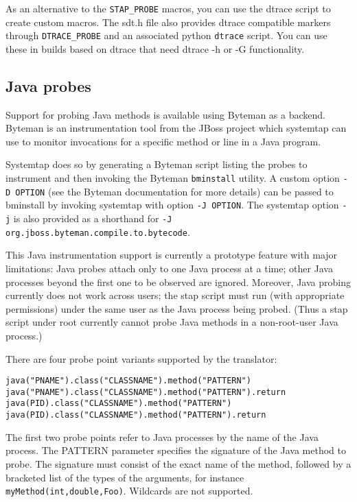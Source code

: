 \documentclass[twoside,english]{article}
\newenvironment{vindent}
{\begin{list}{}{\setlength{\listparindent}{6pt}}
\item[]}
{\end{list}}
\begin{document}
As an alternative to the \texttt{STAP\_PROBE} macros, you can use the
dtrace script to create custom macros. The sdt.h file also provides
dtrace compatible markers through \texttt{DTRACE\_PROBE} and an
associated python \texttt{dtrace} script.  You can use these in builds
based on dtrace that need dtrace -h or -G functionality.

\subsection{Java probes}
Support for probing Java methods is available using Byteman as a
backend. Byteman is an instrumentation tool from the JBoss project
which systemtap can use to monitor invocations for a specific method
or line in a Java program.

Systemtap does so by generating a Byteman script listing the probes to
instrument and then invoking the Byteman \texttt{bminstall} utility. A
custom option \texttt{-D OPTION} (see the Byteman documentation for
more details) can be passed to bminstall by invoking systemtap with
option \texttt{-J OPTION}. The systemtap option \texttt{-j} is also
provided as a shorthand for \texttt{-J
  org.jboss.byteman.compile.to.bytecode}.

This Java instrumentation support is currently a prototype feature
with major limitations: Java probes attach only to one Java process at
a time; other Java processes beyond the first one to be observed are
ignored. Moreover, Java probing currently does not work across users;
the stap script must run (with appropriate permissions) under the same
user as the Java process being probed. (Thus a stap script under
root currently cannot probe Java methods in a non-root-user Java process.)

There are four probe point variants supported by the translator:
\begin{vindent}
\begin{verbatim}
java("PNAME").class("CLASSNAME").method("PATTERN")
java("PNAME").class("CLASSNAME").method("PATTERN").return
java(PID).class("CLASSNAME").method("PATTERN")
java(PID).class("CLASSNAME").method("PATTERN").return
\end{verbatim}
\end{vindent}

The first two probe points refer to Java processes by the name of the
Java process. The PATTERN parameter specifies the signature of the
Java method to probe. The signature must consist of the exact name of
the method, followed by a bracketed list of the types of the
arguments, for instance \texttt{myMethod(int,double,Foo)}. Wildcards
are not supported.
\end{document}
